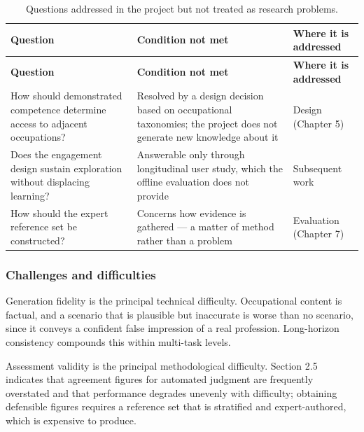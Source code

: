 {\small
\begin{longtable}{|>{\raggedright\arraybackslash}p{}|>{\raggedright\arraybackslash}p{}|>{\raggedright\arraybackslash}p{}|}
\caption{Questions addressed in the project but not treated as research problems.} \\
\hline
\textbf{Question} & \textbf{Condition not met} & \textbf{Where it is addressed} \\ \hline
\endfirsthead
\hline
\textbf{Question} & \textbf{Condition not met} & \textbf{Where it is addressed} \\ \hline
\endhead
How should demonstrated competence determine access to adjacent occupations? & Resolved by a design decision based on occupational taxonomies; the project does not generate new knowledge about it & Design (Chapter 5) \\ \hline
Does the engagement design sustain exploration without displacing learning? & Answerable only through longitudinal user study, which the offline evaluation does not provide & Subsequent work \\ \hline
How should the expert reference set be constructed? & Concerns how evidence is gathered --- a matter of method rather than a problem & Evaluation (Chapter 7) \\ \hline
\end{longtable}
}

\subsubsection{Challenges and difficulties}

Generation fidelity is the principal technical difficulty. Occupational content is factual, and a scenario that is plausible but inaccurate is worse than no scenario, since it conveys a confident false impression of a real profession. Long-horizon consistency compounds this within multi-task levels.

Assessment validity is the principal methodological difficulty. Section 2.5 indicates that agreement figures for automated judgment are frequently overstated and that performance degrades unevenly with difficulty; obtaining defensible figures requires a reference set that is stratified and expert-authored, which is expensive to produce.

